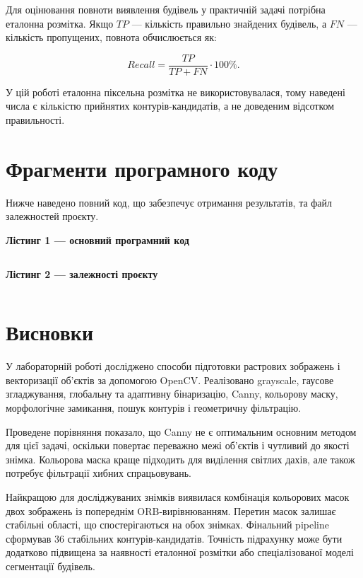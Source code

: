 \documentclass[12pt,a4paper]{article}
\begin{document}
Для оцінювання повноти виявлення будівель у практичній задачі потрібна еталонна розмітка. Якщо \(TP\) --- кількість правильно знайдених будівель, а \(FN\) --- кількість пропущених, повнота обчислюється як:

\begin{equation}
  Recall=\frac{TP}{TP+FN}\cdot100\%.
\end{equation}

У цій роботі еталонна піксельна розмітка не використовувалася, тому наведені числа є кількістю прийнятих контурів-кандидатів, а не доведеним відсотком правильності.

\section{Фрагменти програмного коду}

Нижче наведено повний код, що забезпечує отримання результатів, та файл залежностей проєкту.

\noindent\textbf{Лістинг 1 --- основний програмний код}

\inputminted{python}{../src/main.py}

\noindent\textbf{Лістинг 2 --- залежності проєкту}

\inputminted{text}{../requirements.txt}

\section{Висновки}

У лабораторній роботі досліджено способи підготовки растрових зображень і векторизації об'єктів за допомогою OpenCV. Реалізовано grayscale, гаусове згладжування, глобальну та адаптивну бінаризацію, Canny, кольорову маску, морфологічне замикання, пошук контурів і геометричну фільтрацію.

Проведене порівняння показало, що Canny не є оптимальним основним методом для цієї задачі, оскільки повертає переважно межі об'єктів і чутливий до якості знімка. Кольорова маска краще підходить для виділення світлих дахів, але також потребує фільтрації хибних спрацьовувань.

Найкращою для досліджуваних знімків виявилася комбінація кольорових масок двох зображень із попереднім ORB-вирівнюванням. Перетин масок залишає стабільні області, що спостерігаються на обох знімках. Фінальний pipeline сформував 36 стабільних контурів-кандидатів. Точність підрахунку може бути додатково підвищена за наявності еталонної розмітки або спеціалізованої моделі сегментації будівель.
\end{document}

